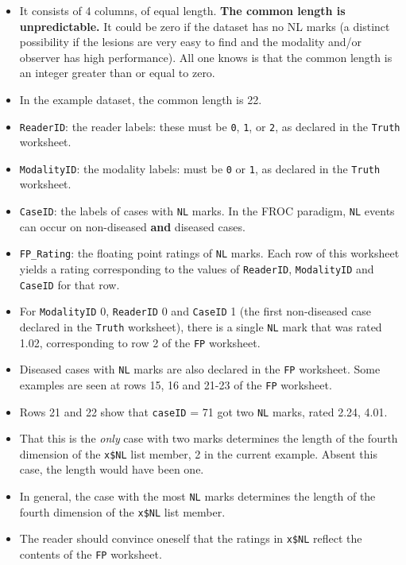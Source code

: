 \documentclass[]{book}
\providecommand{\tightlist}{%
  \setlength{\itemsep}{0pt}\setlength{\parskip}{0pt}}
\begin{document}
\begin{itemize}
\tightlist
\item
  It consists of 4 columns, of equal length. \textbf{The common length is unpredictable.} It could be zero if the dataset has no NL marks (a distinct possibility if the lesions are very easy to find and the modality and/or observer has high performance). All one knows is that the common length is an integer greater than or equal to zero.
\item
  In the example dataset, the common length is 22.
\item
  \texttt{ReaderID}: the reader labels: these must be \texttt{0}, \texttt{1}, or \texttt{2}, as declared in the \texttt{Truth} worksheet.
\item
  \texttt{ModalityID}: the modality labels: must be \texttt{0} or \texttt{1}, as declared in the \texttt{Truth} worksheet.
\item
  \texttt{CaseID}: the labels of cases with \texttt{NL} marks. In the FROC paradigm, \texttt{NL} events can occur on non-diseased \textbf{and} diseased cases.
\item
  \texttt{FP\_Rating}: the floating point ratings of \texttt{NL} marks. Each row of this worksheet yields a rating corresponding to the values of \texttt{ReaderID}, \texttt{ModalityID} and \texttt{CaseID} for that row.
\item
  For \texttt{ModalityID} 0, \texttt{ReaderID} 0 and \texttt{CaseID} 1 (the first non-diseased case declared in the \texttt{Truth} worksheet), there is a single \texttt{NL} mark that was rated 1.02, corresponding to row 2 of the \texttt{FP} worksheet.
\item
  Diseased cases with \texttt{NL} marks are also declared in the \texttt{FP} worksheet. Some examples are seen at rows 15, 16 and 21-23 of the \texttt{FP} worksheet.
\item
  Rows 21 and 22 show that \texttt{caseID} = 71 got two \texttt{NL} marks, rated 2.24, 4.01.
\item
  That this is the \emph{only} case with two marks determines the length of the fourth dimension of the \texttt{x\$NL} list member, 2 in the current example. Absent this case, the length would have been one.
\item
  In general, the case with the most \texttt{NL} marks determines the length of the fourth dimension of the \texttt{x\$NL} list member.
\item
  The reader should convince oneself that the ratings in \texttt{x\$NL} reflect the contents of the \texttt{FP} worksheet.
\end{itemize}
\end{document}
